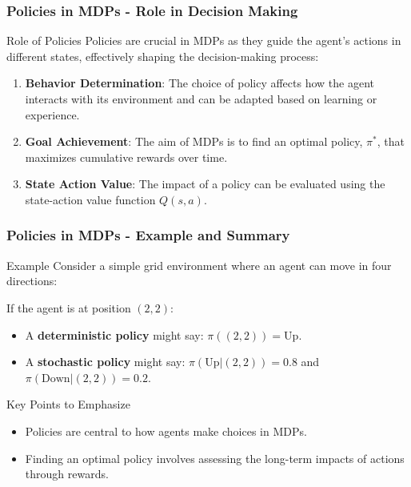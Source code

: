 \documentclass[aspectratio=169]{beamer}
\begin{document}
\begin{frame}[fragile]
    \frametitle{Policies in MDPs - Role in Decision Making}
    \begin{block}{Role of Policies}
        Policies are crucial in MDPs as they guide the agent's actions in different states, effectively shaping the decision-making process:
    \end{block}
    
    \begin{enumerate}
        \item \textbf{Behavior Determination}: The choice of policy affects how the agent interacts with its environment and can be adapted based on learning or experience.
        
        \item \textbf{Goal Achievement}: The aim of MDPs is to find an optimal policy, \( \pi^* \), that maximizes cumulative rewards over time.
        
        \item \textbf{State Action Value}: The impact of a policy can be evaluated using the state-action value function \( Q(s, a) \).
    \end{enumerate}
\end{frame}

\begin{frame}[fragile]
    \frametitle{Policies in MDPs - Example and Summary}
    \begin{block}{Example}
        Consider a simple grid environment where an agent can move in four directions:
        
        If the agent is at position \( (2,2) \):
        \begin{itemize}
            \item A \textbf{deterministic policy} might say: \( \pi((2,2)) = \text{Up} \).
            \item A \textbf{stochastic policy} might say: \( \pi(\text{Up}|(2,2)) = 0.8 \) and \( \pi(\text{Down}|(2,2)) = 0.2 \).
        \end{itemize}
    \end{block}

    \begin{block}{Key Points to Emphasize}
        \begin{itemize}
            \item Policies are central to how agents make choices in MDPs.
            \item Finding an optimal policy involves assessing the long-term impacts of actions through rewards.
        \end{itemize}
    \end{block}
\end{frame}
\end{document}
